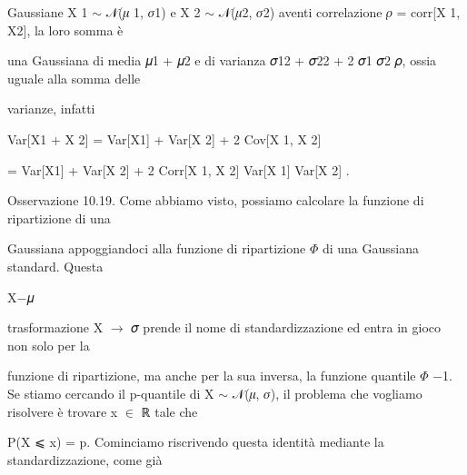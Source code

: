 \documentclass[a4paper,portrait,12pt]{article}
\begin{document}
\begin{flushleft}
Gaussiane X 1 $\sim$ 𝒩(𝜇 1, 𝜎1) e X 2 $\sim$ 𝒩(𝜇2, 𝜎2) aventi correlazione 𝜌 = corr[X 1, X2], la loro somma \`{e}
\end{flushleft}


\begin{flushleft}
una Gaussiana di media 𝜇1 + 𝜇2 e di varianza 𝜎12 + 𝜎22 + 2 𝜎1 𝜎2 𝜌, ossia uguale alla somma delle
\end{flushleft}


\begin{flushleft}
varianze, infatti
\end{flushleft}


\begin{flushleft}
Var[X1 + X 2] = Var[X1] + Var[X 2] + 2 Cov[X 1, X 2]
\end{flushleft}


\begin{flushleft}
= Var[X1] + Var[X 2] + 2 Corr[X 1, X 2] Var[X 1] Var[X 2] .
\end{flushleft}


\begin{flushleft}
Osservazione 10.19. Come abbiamo visto, possiamo calcolare la funzione di ripartizione di una
\end{flushleft}


\begin{flushleft}
Gaussiana appoggiandoci alla funzione di ripartizione $\Phi$ di una Gaussiana standard. Questa
\end{flushleft}


\begin{flushleft}
X$-$𝜇
\end{flushleft}


\begin{flushleft}
trasformazione X $\rightarrow$ 𝜎 prende il nome di standardizzazione ed entra in gioco non solo per la
\end{flushleft}


\begin{flushleft}
funzione di ripartizione, ma anche per la sua inversa, la funzione quantile $\Phi$ $-$1. Se stiamo cercando il p-quantile di X $\sim$ 𝒩(𝜇, 𝜎), il problema che vogliamo risolvere \`{e} trovare x $\in$ ℝ tale che
\end{flushleft}


\begin{flushleft}
P(X ⩽ x) = p. Cominciamo riscrivendo questa identit\`{a} mediante la standardizzazione, come gi\`{a}
\end{flushleft}
\end{document}
